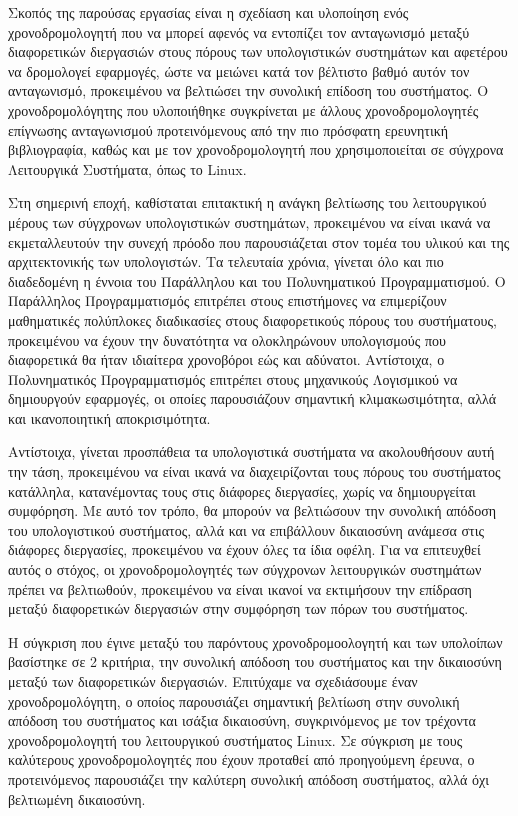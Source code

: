 \documentclass[diploma]{Styles/softlab-thesis}
\begin{document}
\cleardoublepage

{}
\begin{abstractgr}%
\small

Σκοπός της παρούσας εργασίας είναι η σχεδίαση και υλοποίηση ενός χρονοδρομολογητή που να μπορεί αφενός να εντοπίζει τον ανταγωνισμό μεταξύ διαφορετικών διεργασιών στους πόρους των υπολογιστικών συστημάτων και αφετέρου να δρομολογεί εφαρμογές, ώστε να μειώνει κατά τον βέλτιστο βαθμό αυτόν τον ανταγωνισμό, προκειμένου να βελτιώσει την συνολική επίδοση του συστήματος. Ο χρονοδρομολόγητης που υλοποιήθηκε συγκρίνεται με άλλους χρονοδρομολογητές επίγνωσης ανταγωνισμού προτεινόμενους από την πιο πρόσφατη ερευνητική βιβλιογραφία, καθώς και με τον χρονοδρομολογητή που χρησιμοποιείται σε σύγχρονα Λειτουργικά Συστήματα, όπως το Linux.

Στη σημερινή εποχή, καθίσταται επιτακτική η ανάγκη βελτίωσης του λειτουργικού μέρους των σύγχρονων υπολογιστικών συστημάτων, προκειμένου να είναι ικανά να εκμεταλλευτούν την συνεχή πρόοδο που παρουσιάζεται στον τομέα του υλικού και της αρχιτεκτονικής των υπολογιστών. Τα τελευταία χρόνια, γίνεται όλο και πιο διαδεδομένη η έννοια του Παράλληλου και του Πολυνηματικού Προγραμματισμού. Ο Παράλληλος Προγραμματισμός επιτρέπει στους επιστήμονες να επιμερίζουν μαθηματικές πολύπλοκες διαδικασίες στους διαφορετικούς πόρους του συστήματους, προκειμένου να έχουν την δυνατότητα να ολοκληρώνουν υπολογισμούς που διαφορετικά θα ήταν ιδιαίτερα χρονοβόροι εώς και αδύνατοι. Αντίστοιχα, ο Πολυνηματικός Προγραμματισμός επιτρέπει στους μηχανικούς Λογισμικού να δημιουργούν εφαρμογές, οι οποίες παρουσιάζουν σημαντική κλιμακωσιμότητα, αλλά και ικανοποιητική αποκρισιμότητα.

Αντίστοιχα, γίνεται προσπάθεια τα υπολογιστικά συστήματα να ακολουθήσουν αυτή την τάση, προκειμένου να είναι ικανά να διαχειρίζονται τους πόρους του συστήματος κατάλληλα, κατανέμοντας τους στις διάφορες διεργασίες, χωρίς να δημιουργείται συμφόρηση. Με αυτό τον τρόπο, θα μπορούν να βελτιώσουν την συνολική απόδοση του υπολογιστικού συστήματος, αλλά και να επιβάλλουν δικαιοσύνη ανάμεσα στις διάφορες διεργασίες, προκειμένου να έχουν όλες τα ίδια οφέλη. Για να επιτευχθεί αυτός ο στόχος, οι χρονοδρομολογητές των σύγχρονων λειτουργικών συστημάτων πρέπει να βελτιωθούν, προκειμένου να είναι ικανοί να εκτιμήσουν την επίδραση μεταξύ διαφορετικών διεργασιών στην συμφόρηση των πόρων του συστήματος.

Η σύγκριση που έγινε μεταξύ του παρόντους χρονοδρομοολογητή και των υπολοίπων βασίστηκε σε 2 κριτήρια, την συνολική απόδοση του συστήματος και την δικαιοσύνη μεταξύ των διαφορετικών διεργασιών. Επιτύχαμε να σχεδιάσουμε έναν χρονοδρομολόγητη, ο οποίος παρουσιάζει σημαντική βελτίωση στην συνολική απόδοση του συστήματος και ισάξια δικαιοσύνη, συγκρινόμενος με τον τρέχοντα χρονοδρομολογητή του λειτουργικού συστήματος Linux. Σε σύγκριση με τους καλύτερους χρονοδρομολογητές που έχουν προταθεί από προηγούμενη έρευνα, ο προτεινόμενος παρουσιάζει την καλύτερη συνολική απόδοση συστήματος, αλλά όχι βελτιωμένη δικαιοσύνη.



\end{abstractgr}
\end{document}
